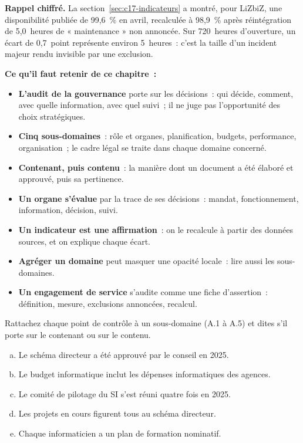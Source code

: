 \begin{boxinfo}
\textbf{Rappel chiffré.} La section~\ref{sec:c17-indicateurs} a montré, pour LiZbiZ, une
disponibilité publiée de 99,6~\% en avril, recalculée à 98,9~\% après
réintégration de 5,0~heures de « maintenance » non annoncée. Sur 720~heures
d'ouverture, un écart de 0,7~point représente environ 5~heures~: c'est la
taille d'un incident majeur rendu invisible par une exclusion.
\end{boxinfo}

\separateur

\begin{boxresume}
\textbf{Ce qu'il faut retenir de ce chapitre~:}
\begin{itemize}
    \item \textbf{L'audit de la gouvernance} porte sur les décisions~: qui
          décide, comment, avec quelle information, avec quel suivi~; il ne
          juge pas l'opportunité des choix stratégiques.
    \item \textbf{Cinq sous-domaines}~: rôle et organes, planification,
          budgets, performance, organisation~; le cadre légal se traite
          dans chaque domaine concerné.
    \item \textbf{Contenant, puis contenu}~: la manière dont un document a
          été élaboré et approuvé, puis sa pertinence.
    \item \textbf{Un organe s'évalue} par la trace de ses décisions~:
          mandat, fonctionnement, information, décision, suivi.
    \item \textbf{Un indicateur est une affirmation}~: on le recalcule à
          partir des données sources, et on explique chaque écart.
    \item \textbf{Agréger un domaine} peut masquer une opacité locale~:
          lire aussi les sous-domaines.
    \item \textbf{Un engagement de service} s'audite comme une fiche d'assertion~: définition, mesure, exclusions annoncées, recalcul.
\end{itemize}
\end{boxresume}

\bigskip

\begin{boxexo}[title={\ding{45}\quad Exercice~17.1. Classer les points de contrôle \niveaubase}]
Rattachez chaque point de contrôle à un sous-domaine (A.1 à A.5) et dites
s'il porte sur le contenant ou sur le contenu.
\begin{enumerate}[(a)]
    \item Le schéma directeur a été approuvé par le conseil en 2025.
    \item Le budget informatique inclut les dépenses informatiques des
          agences.
    \item Le comité de pilotage du SI s'est réuni quatre fois en 2025.
    \item Les projets en cours figurent tous au schéma directeur.
    \item Chaque informaticien a un plan de formation nominatif.
\end{enumerate}
\end{boxexo}

